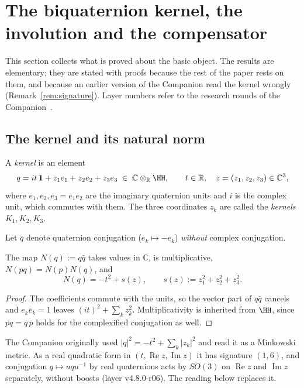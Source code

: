 \section{The biquaternion kernel, the involution and the compensator}\label{sec:kernel}

This section collects what is proved about the basic object.  The results are elementary; they are stated with proofs
because the rest of the paper rests on them, and because an earlier version of the Companion read the kernel wrongly
(Remark~\ref{rem:signature}).  Layer numbers refer to the research rounds of the Companion~\cite{companion}.

\subsection{The kernel and its natural norm}

\begin{definition}\label{def:kernel}
A \emph{kernel} is an element
\[
q = it\,\mathbf 1 + z_1e_1+z_2e_2+z_3e_3 \;\in\; \mathbb C\otimes_{\mathbb R}\HH,
\qquad t\in\mathbb R,\quad z=(z_1,z_2,z_3)\in\mathbb C^3,
\]
where \(e_1,e_2,e_3=e_1e_2\) are the imaginary quaternion units and \(i\) is the complex unit, which commutes with them.
The three coordinates \(z_k\) are called the \emph{kernels} \(K_1,K_2,K_3\).
\end{definition}

Let \(\bar q\) denote quaternion conjugation (\(e_k\mapsto-e_k\)) \emph{without} complex conjugation.

\begin{proposition}\label{prop:norm}
The map \(N(q):=q\bar q\) takes values in \(\mathbb C\), is multiplicative, \(N(pq)=N(p)N(q)\), and
\[
N(q)=-t^2+s(z),\qquad s(z):=z_1^2+z_2^2+z_3^2 .
\]
\end{proposition}

\begin{proof}
The coefficients commute with the units, so the vector part of \(q\bar q\) cancels and \(e_k\bar e_k=1\) leaves
\((it)^2+\sum_kz_k^2\).  Multiplicativity is inherited from \(\HH\), since \(\overline{pq}=\bar q\,\bar p\) holds for the
complexified conjugation as well.
\end{proof}

\begin{remark}\label{rem:signature}
The Companion originally used \(|q|^2=-t^2+\sum_k|z_k|^2\) and read it as a Minkowski metric.  As a real quadratic form in
\((t,\operatorname{Re}z,\operatorname{Im}z)\) it has signature \((1,6)\), and conjugation \(q\mapsto uqu^{-1}\) by real
quaternions acts by \(SO(3)\) on \(\operatorname{Re}z\) and \(\operatorname{Im}z\) separately, without boosts (layer
v4.8.0-r06).  The reading below replaces it.
\end{remark}

